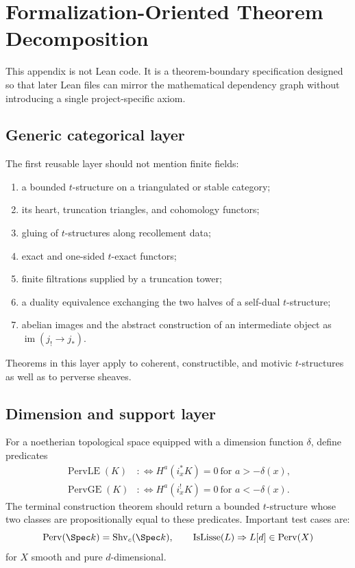 \chapter{Formalization-Oriented Theorem Decomposition}
\label{app:perverse-formalization}

This appendix is not Lean code.  It is a theorem-boundary specification
designed so that later Lean files can mirror the mathematical dependency
graph without introducing a single project-specific axiom.

\section{Generic categorical layer}

The first reusable layer should not mention finite fields:

\begin{enumerate}
\item a bounded \(t\)-structure on a triangulated or stable category;
\item its heart, truncation triangles, and cohomology functors;
\item gluing of \(t\)-structures along recollement data;
\item exact and one-sided \(t\)-exact functors;
\item finite filtrations supplied by a truncation tower;
\item a duality equivalence exchanging the two halves of a self-dual
      \(t\)-structure;
\item abelian images and the abstract construction of an intermediate object
      as \(\operatorname{im}(j_!\to j_*)\).
\end{enumerate}

Theorems in this layer apply to coherent, constructible, and motivic
\(t\)-structures as well as to perverse sheaves.

\section{Dimension and support layer}

For a noetherian topological space equipped with a dimension function
\(\delta\), define predicates
\[
\begin{aligned}
\operatorname{PervLE}(K)&:\Longleftrightarrow
 H^a(i_x^*K)=0\ \text{for }a>-\delta(x),\\
\operatorname{PervGE}(K)&:\Longleftrightarrow
 H^a(i_x^!K)=0\ \text{for }a<-\delta(x).
\end{aligned}
\]
The terminal construction theorem should return a bounded \(t\)-structure
whose two classes are propositionally equal to these predicates.  Important
test cases are:
\[
 \operatorname{Perv}(\Spec k)=\operatorname{Shv}_c(\Spec k),\qquad
 \operatorname{IsLisse}(L)\Rightarrow L[d]\in\operatorname{Perv}(X)
\]
for \(X\) smooth and pure \(d\)-dimensional.

